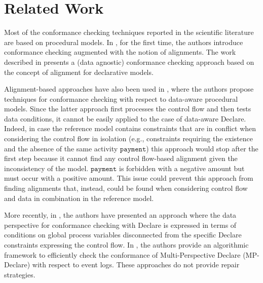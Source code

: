 \section{Related Work}
\label{sec:related}

Most of the conformance checking techniques reported in the scientific literature are based on procedural models. In \cite{DBLP:conf/edoc/AdriansyahDA11}, for the first time, the authors introduce conformance checking augmented with the notion of alignments. The work described in \cite{LeoniMA12} presents a (data agnostic) conformance checking approach based on the concept of alignment for declarative models.

Alignment-based approaches have also been used in \cite{MultiPerspective}, where the authors propose techniques for conformance checking with respect to data-aware procedural models. Since the latter approach first processes the control flow and then tests data conditions, it cannot be easily applied to the case of data-aware Declare. Indeed, in case the reference model contains constraints that are in conflict when considering the control flow in isolation (e.g., constraints requiring the existence and the absence of the same activity $\texttt{payment}$) this approach would stop after the first step because it cannot find any control flow-based alignment given the inconsistency of the model.  $\texttt{payment}$ is forbidden with a negative amount but must occur with a positive amount. This issue could prevent this approach from finding alignments that, instead, could be found when considering control flow and data in combination in the reference model.

More recently, in \cite{Borrego014}, the authors have presented an approach where the data perspective for conformance checking with Declare is expressed in terms of conditions on global process variables disconnected from the specific Declare constraints expressing the control flow. In \cite{BurattinMS16}, the authors provide an algorithmic framework to efficiently check the conformance of Multi-Perspective Declare (MP-Declare) with respect to event logs. These approaches do not provide repair strategies. 